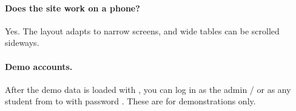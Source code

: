 \documentclass[11pt,a4paper]{article}
\begin{document}
\paragraph{Does the site work on a phone?} Yes. The layout adapts to narrow screens, and wide tables
can be scrolled sideways.

\paragraph{Demo accounts.} After the demo data is loaded with , you can log
in as the admin  /  or as any student from
 to  with password .
These are for demonstrations only.
\end{document}

